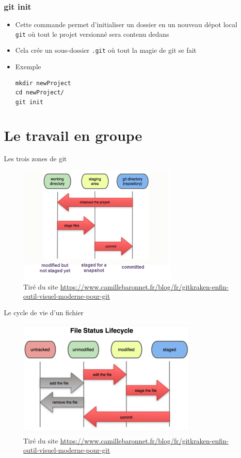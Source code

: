 \documentclass{beamer}
\begin{document}
\begin{frame}[fragile]
\frametitle{git init}

\begin{itemize}
\item Cette commande permet d'initialiser un dossier en un nouveau dépot local \texttt{git} où tout le projet versionné sera contenu dedans

\item Cela crée un sous-dossier \texttt{.git} où tout la magie de git se fait
\item Exemple
\begin{lstlisting}
mkdir newProject
cd newProject/
git init
\end{lstlisting}
\end{itemize}
\end{frame}

  \section{Le travail en groupe}
\begin{frame}{Les trois zones de git}
\begin{figure}
    \centering
    \includegraphics[height=6cm]{img/git-local-operations.png}
    \caption{Tiré du site \url{https://www.camillebaronnet.fr/blog/fr/gitkraken-enfin-outil-visuel-moderne-pour-git}}
\end{figure}
\end{frame}

\begin{frame}{Le cycle de vie d'un fichier}
\begin{figure}
    \centering
    \includegraphics[height=6cm]{img/git-filestatuslifecycle.png}
    \caption{Tiré du site \url{https://www.camillebaronnet.fr/blog/fr/gitkraken-enfin-outil-visuel-moderne-pour-git}}
\end{figure}
\end{frame}
\end{document}

